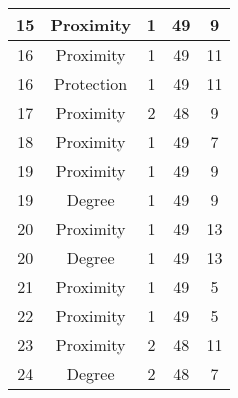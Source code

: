 \documentclass[results.tex]{subfiles}
\begin{document}
\begin{center}
\begin{tabular}{| c || c | c | c | c |}
            \hline
            15                      & Proximity                    & 1                      & 49                      & 9                    \\
            \hline
            16                      & Proximity                    & 1                      & 49                      & 11                   \\
            \hline
            16                      & Protection                   & 1                      & 49                      & 11                   \\
            \hline
            17                      & Proximity                    & 2                      & 48                      & 9                    \\
            \hline
            18                      & Proximity                    & 1                      & 49                      & 7                    \\
            \hline
            19                      & Proximity                    & 1                      & 49                      & 9                    \\
            \hline
            19                      & Degree                       & 1                      & 49                      & 9                    \\
            \hline
            20                      & Proximity                    & 1                      & 49                      & 13                   \\
            \hline
            20                      & Degree                       & 1                      & 49                      & 13                   \\
            \hline
            21                      & Proximity                    & 1                      & 49                      & 5                    \\
            \hline
            22                      & Proximity                    & 1                      & 49                      & 5                    \\
            \hline
            23                      & Proximity                    & 2                      & 48                      & 11                   \\
            \hline
            24                      & Degree                       & 2                      & 48                      & 7                    \\

\end{tabular}
\end{center}
\end{document}
